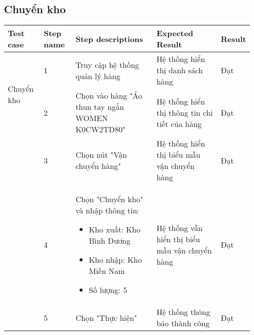 \subsection{Chuyển kho}
{
    \setlength\extrarowheight{6pt}
    \begin{longtable}{| p{2.5cm}| p{1cm}| p{5.5cm}| p{4.5cm} | p{1.5cm} |}
        \hline
        \textbf{Test case} & \textbf{Step name} & \textbf{Step descriptions} & \textbf{Expected Result} & \textbf{Result} \\
        \hline
        \multirow[t]{2}{2.5cm}{Chuyển kho} & 1 & Truy cập hệ thống quản lý hàng & Hệ thống hiển thị danh sách hàng & Đạt \\
        \cline{2-5}
         & 2 & Chọn vào hàng "Áo thun tay ngắn WOMEN K0CW2TD80" & Hệ thống hiển thị thông tin chi tiết của hàng & Đạt \\
        \cline{2-5}
        & 3 & Chọn nút "Vận chuyển hàng" & Hệ thống hiển thị biểu mẫu vận chuyển hàng & Đạt \\
        \cline{2-5}
         & 4 & Chọn "Chuyển kho" và nhập thông tin:
         \begin{itemize}
            \item Kho xuất: Kho Bình Dương
            \item Kho nhập: Kho Miền Nam
            \item Số lượng: 5
         \end{itemize}
         & Hệ thống vẫn hiển thị biểu mẫu vận chuyển hàng & Đạt \\
         \cline{2-5}
         & 5 & Chọn "Thực hiện" & Hệ thống thông báo thành công & Đạt \\
        \hline
    \end{longtable} 
}

